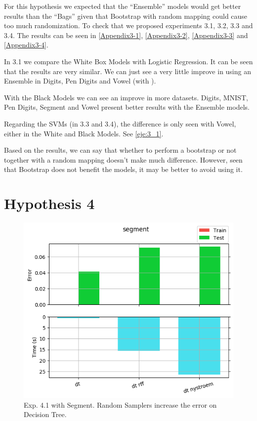 \begin{pre-delivery}
For this hypothesis we expected that the ``Ensemble'' models would get
better results than the ``Bags'' given that Bootstrap with random mapping
could cause too much randomization. To check that we proposed experiments
3.1, 3.2, 3.3 and 3.4. The results can be seen in
\ref{Appendix3-1},
\ref{Appendix3-2},
\ref{Appendix3-3} and
\ref{Appendix3-4}.

In 3.1 we compare the White Box Models with Logistic Regression. It can be seen
that the results are very similar. We can just see a very little improve in using
an Ensemble in Digits, Pen Digits and Vowel (with \Nys).

With the Black Models we can see an improve in more datasets.
Digits, MNIST, Pen Digits, Segment and Vowel present better results with the
Ensemble models.

Regarding the SVMs (in 3.3 and 3.4), the difference is only seen with Vowel,
either in the White and Black Models. See \ref{eje:3_1}.

Based on the results, we can say that whether to perform a bootstrap or not
together with a random mapping doesn't make much difference. However, seen
that Bootstrap does not benefit the models, it may be better to avoid using
it.

\section*{Hypothesis 4}
\label{disc:h4}

\begin{figure}[th]
\centering
\includegraphics[scale=0.6]{Figures/4_1/segment}
\decoRule
\caption{Exp. 4.1 with Segment. Random Samplers increase the error on Decision Tree.}
\label{eje:4_1}
\end{figure}


\end{pre-delivery}

